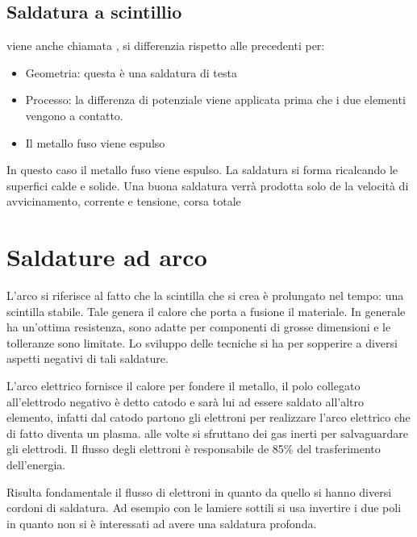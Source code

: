 
\subsection{Saldatura a scintillio}
viene anche chiamata , si differenzia rispetto alle precedenti per:
\begin{itemize}
\item Geometria: questa è una saldatura di testa
\item Processo: la differenza di potenziale viene applicata prima che i due elementi vengono a contatto.
\item Il metallo fuso viene espulso
\end{itemize}

In questo caso il metallo fuso viene espulso.
La saldatura si forma ricalcando le superfici calde e solide.
Una buona saldatura verrà prodotta solo de la velocità di avvicinamento, corrente e tensione, corsa totale \todo{\\Completa}

\section{Saldature ad arco}
L'arco si riferisce al fatto che la scintilla che si crea è prolungato nel tempo: una scintilla stabile.
Tale genera il calore che porta a fusione il materiale.
In generale ha un'ottima resistenza, sono adatte per componenti di grosse dimensioni e le tolleranze sono limitate.
Lo sviluppo delle tecniche si ha per sopperire a diversi aspetti negativi di tali saldature.

L'arco elettrico fornisce il calore per fondere il metallo, il polo collegato all'elettrodo negativo è detto catodo e sarà lui ad essere saldato all'altro elemento, infatti dal catodo partono gli elettroni per realizzare l'arco elettrico che di fatto diventa un plasma.
alle volte si sfruttano dei gas inerti per salvaguardare gli elettrodi.
Il flusso degli elettroni è responsabile de 85\% del trasferimento dell'energia. 


Risulta fondamentale il flusso di elettroni in quanto da quello si hanno diversi cordoni di saldatura.
Ad esempio con le lamiere sottili si usa invertire i due poli in quanto non si è interessati ad avere una saldatura profonda.

